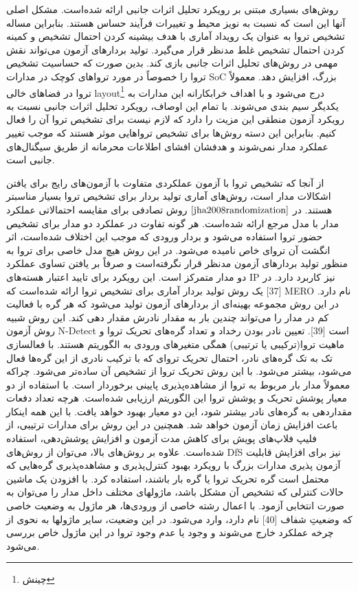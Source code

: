 روش‌های بسیاری مبتنی بر رویکرد تحلیل اثرات جانبی ارائه شده‌است. مشکل اصلی آنها این است که نسبت به نویز محیط و تغییرات فرآیند حساس هستند. بنابراین مساله تشخیص تروا به عنوان یک رویداد آماری با هدف بیشینه کردن احتمال تشخیص و کمینه کردن احتمال تشخیص غلط مدنظر قرار می‌گیرد. تولید بردارهای آزمون می‌تواند نقش مهمی در روش‌های تحلیل اثرات جانبی بازی کند. بدین صورت که حساسیت تشخیص تروا را خصوصاً در مورد تروا‌های کوچک در مدارات SoC بزرگ، افزایش دهد. معمولاً تروا در فضاهای خالی layout\footnote{چینش} درج می‌شود و با اهداف خرابکارانه این مدارات به یکدیگر سیم بندی می‌شوند.  با تمام این اوصاف، رویکرد تحلیل اثرات جانبی نسبت به رویکرد آزمون منطقی این مزیت را دارد که لازم نیست برای تشخیص تروا آن را فعال کنیم. بنابراین این دسته روش‌ها برای تشخیص تروا‌هایی موثر هستند که موجب تغییر عملکرد مدار نمی‌شوند و هدفشان افشای اطلاعات محرمانه از طریق سیگنال‌های جانبی است.

از آنجا که تشخیص تروا با آزمون عملکردی متفاوت با آزمون‌های رایج برای یافتن اشکالات مدار است، روش‌های آماری تولید بردار برای تشخیص تروا بسیار مناسبتر هستند. در  $\cite{jha2008randomization}$ روش تصادفی برای مقایسه احتمالاتی عملکرد مدار با مدل مرجع ارائه شده‌است. هر گونه تفاوت در عملکرد دو مدار برای تشخیص حضور تروا استفاده می‌شود و بردار ورودی که موجب این اختلاف شده‌است، اثر انگشت آن تروای خاص نامیده می‌شود. در این روش هیچ مدل خاصی برای تروا به منظور تولید بردارهای آزمون مدنظر قرار نگرفته‌است و صرفاً بر یافتن تساوی عملکرد دو مدار متمرکز است. این رویکرد برای تایید اعتبار هسته‌های IP نیز کاربرد دارد.
در [37] یک روش تولید بردار آماری برای تشخیص تروا ارائه شده‌است که MERO نام دارد. در این روش مجموعه بهینه‌ای از بردارهای آزمون تولید می‌شود که هر گره با فعالیت کم در مدار را می‌تواند چندین بار به مقدار نادرش مقدار دهی کند. این روش شبیه روش آزمون N-Detect است [39]. تعیین نادر بودن رخداد و تعداد گره‌های تحریک تروا و ماهیت تروا(ترکیبی یا ترتیبی) همگی متغیرهای ورودی به الگوریتم هستند. با فعالسازی تک به تک گره‌های نادر، احتمال تحریک تروای که با ترکیب نادری از این گره‌ها فعال می‌شود، بیشتر می‌شود. با این روش تحریک تروا از تشخیص آن ساده‌تر می‌شود. چراکه معمولاً مدار بار مربوط به تروا از مشاهده‌پذیری پایینی برخوردار است. با استفاده از دو معیار پوشش تحریک و پوشش تروا این الگوریتم ارزیابی شده‌است. هرچه تعداد دفعات مقداردهی به گره‌های نادر بیشتر شود، این دو معیار بهبود خواهد یافت. با این همه اینکار باعث افزایش زمان آزمون خواهد شد. همچنین در این روش برای مدارات ترتیبی، از فلیپ فلاپ‌های پویش برای کاهش مدت آزمون و افزایش پوشش‌دهی، استفاده شده‌است.
علاوه بر روش‌های بالا،  می‌توان از روش‌های DfS  نیز برای افزایش قابلیت آزمون پذیری مدارات بزرگ با رویکرد بهبود کنترل‌پذیری و مشاهده‌پذیری گره‌هایی که محتمل است گره تحریک تروا یا گره بار باشند، استفاده کرد. با افزودن یک ماشین حالات کنترلی که تشخیص آن مشکل باشد، ماژولهای مختلف داخل مدار را می‌توان به صورت انتخابی آزمود. با اعمال رشته خاصی از ورودی‌ها، هر ماژول به وضعیت خاصی که وضعیتِ شفاف [40] نام دارد، وارد می‌شود. در این وضعیت، سایر ماژولها به نحوی از چرخه عملکرد خارج می‌شوند و وجود یا عدم وجود تروا در این ماژول خاص بررسی می‌شود.


